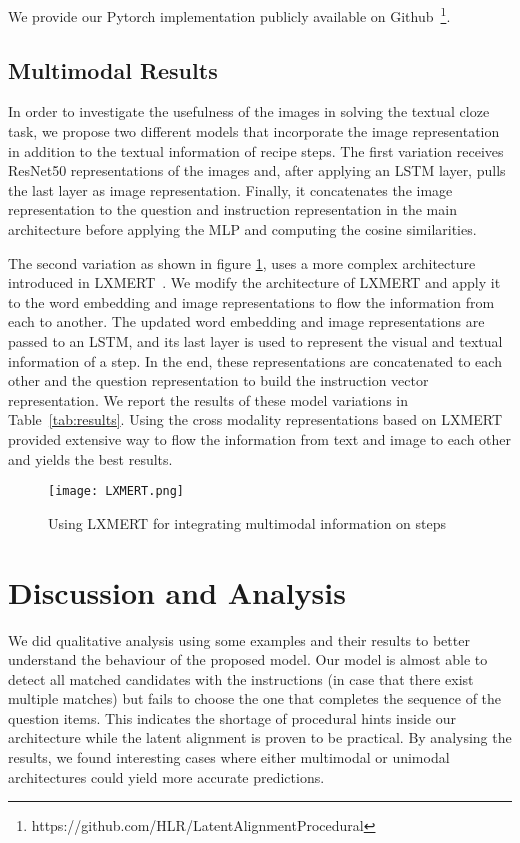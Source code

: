 \documentclass[11pt,a4paper]{article}
\begin{document}
We provide our Pytorch implementation publicly available on Github~\footnote{https://github.com/HLR/LatentAlignmentProcedural}.
\subsection{Multimodal Results}
\label{sec:ablation}
In order to investigate the usefulness of the images in solving the textual cloze task, we propose two different models that incorporate the image representation in addition to the textual information of recipe steps. The first variation receives ResNet50 representations of the images and, after applying an LSTM layer, pulls the last layer as image representation. Finally, it concatenates the image representation to the question and instruction representation in the main architecture before applying the MLP and computing the cosine similarities. 


The second variation as shown in figure \ref{fig:lxmert}, uses a more complex architecture introduced in LXMERT~\cite{tan-bansal-2019-lxmert}. We modify the architecture of LXMERT and apply it to the word embedding and image representations to flow the information from each to another. The updated word embedding and image representations are passed to an LSTM, and its last layer is used to represent the visual and textual information of a step. In the end, these representations are concatenated to each other and the question representation to build the instruction vector representation.
We report the results of these model variations in Table~\ref{tab:results}. Using the cross modality representations based on LXMERT provided extensive way to flow the information from text and image to each other and yields the best results.
\begin{figure}[h]
    \centering
    \texttt{[image: LXMERT.png]}
    \caption{Using LXMERT for integrating multimodal information on steps}
    \label{fig:lxmert}
\end{figure}


\section{Discussion and Analysis}
\label{sec:discussion}
We did qualitative analysis using some examples and their results to better understand the behaviour of the proposed model.
Our model is almost able to detect all matched candidates with the instructions (in case that there exist multiple matches) but fails to choose the one that completes the sequence of the question items. 
This indicates the shortage of procedural hints inside our architecture while the latent alignment is proven to be practical.
By analysing the results, we found interesting cases where either multimodal or unimodal architectures could yield more accurate predictions.
\end{document}
